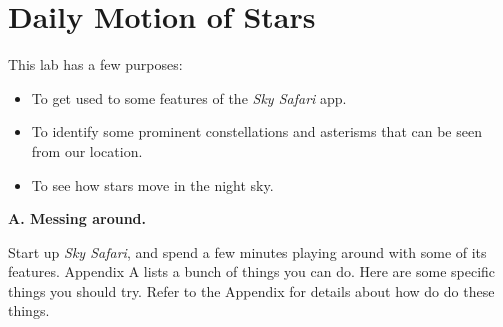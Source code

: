 \chapter{Daily Motion of Stars}

This lab has a few purposes:
\begin{itemize}
\item To get used to some features of the {\it Sky Safari}
app.
\item To identify some prominent constellations and asterisms
that can be seen from our location.
\item To see how stars move in the night sky.
\end{itemize}

\bigskip

{\bf A. Messing around.}

Start up {\it Sky Safari}, and spend a few minutes playing around with
some of its features. Appendix A lists a bunch of things
you can do. Here are some specific things you should try. Refer
to the Appendix for details about how do do these things.

